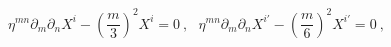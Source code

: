 \begin{equation}
\eta^{mn} \partial_m \partial_n X^i
  - \left( \frac{m}{3} \right)^2 X^i = 0 ~,~~~
\eta^{mn} \partial_m \partial_n X^{i'}
  - \left( \frac{m}{6} \right)^2 X^{i'} = 0~,
\label{beom}
\end{equation}

